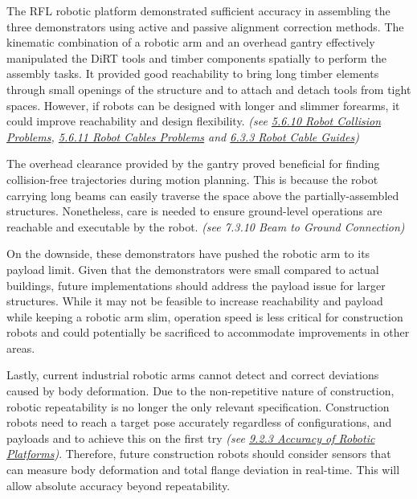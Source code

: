 
The RFL robotic platform demonstrated sufficient accuracy in assembling the three demonstrators using active and passive alignment correction methods. The kinematic combination of a robotic arm and an overhead gantry effectively manipulated the DiRT tools and timber components spatially to perform the assembly tasks. It provided good reachability to bring long timber elements through small openings of the structure and to attach and detach tools from tight spaces. However, if robots can be designed with longer and slimmer forearms, it could improve reachability and design flexibility. \textit{(see \uline{5.6.10 Robot Collision Problems}, \uline{5.6.11 Robot Cables Problems} and \uline{6.3.3 Robot Cable Guides})}

The overhead clearance provided by the gantry proved beneficial for finding collision-free trajectories during motion planning. This is because the robot carrying long beams can easily traverse the space above the partially-assembled structures. Nonetheless, care is needed to ensure ground-level operations are reachable and executable by the robot. \textit{(see 7.3.10 Beam to Ground Connection)}

On the downside, these demonstrators have pushed the robotic arm to its payload limit. Given that the demonstrators were small compared to actual buildings, future implementations should address the payload issue for larger structures. While it may not be feasible to increase reachability and payload while keeping a robotic arm slim, operation speed is less critical for construction robots and could potentially be sacrificed to accommodate improvements in other areas.

Lastly, current industrial robotic arms cannot detect and correct deviations caused by body deformation. Due to the non-repetitive nature of construction, robotic repeatability is no longer the only relevant specification. Construction robots need to reach a target pose accurately regardless of configurations, and payloads and to achieve this on the first try \textit{(see \uline{9.2.3 Accuracy of Robotic Platforms})}. Therefore, future construction robots should consider sensors that can measure body deformation and total flange deviation in real-time. This will allow absolute accuracy beyond repeatability. 



